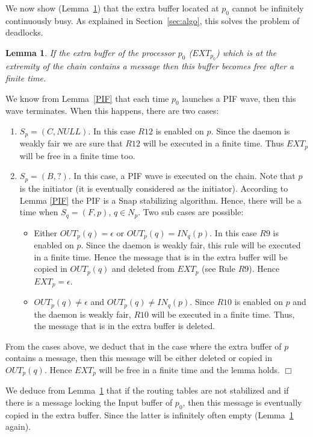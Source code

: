 \documentclass{llncs}
\renewenvironment{proof}{{\it Proof. } }{{\hfill $\Box$}\vspace{.5pc}}
\newtheorem{lem}{Lemma}
\begin{document}
We now show (Lemma~\ref{INTFree}) that the extra buffer located at $p_0$ cannot be infinitely continuously busy.  As explained in
Section~\ref{sec:algo}, this solves the problem of deadlocks. 

\begin{lem}\label{INTFree}
If the extra buffer of the processor $p_0$ ($EXT_{p_0}$) which is at the extremity of the chain contains a message then
this buffer becomes free after a finite time.
\end{lem}  

\begin{proof}
We know from Lemma~\ref{PIF} that each time $p_0$
launches a PIF wave, then this wave terminates.  When this happens, there are two cases:
\begin{enumerate}
\item{$S_{p}=(C,NULL)$}. In this case $R12$ is enabled on $p$. Since the daemon is weakly fair we are sure that $R12$ will be executed in a finite time. Thus $EXT_{p}$ will be free in a finite time too.
\item{$S_{p}=(B,?)$}. In this case, a PIF wave is executed on the chain. Note that $p$ is the initiator (it is eventually considered as the initiator). According to Lemma \ref{PIF} the PIF is a Snap stabilizing algorithm. Hence, there will be a time when $S_{q}=(F,p)$, $q \in N_{p}$. Two sub cases are possible:
\begin{itemize}
\item\label{BINT}{Either $OUT_{p}(q)=\epsilon$ or $OUT_{p}(q)=IN_{q}(p)$}. In this case $R9$ is enabled on $p$. Since the daemon is weakly fair, this rule will be executed in a finite time. Hence the message that is in the extra buffer will be copied in $OUT_{p}(q)$ and deleted from $EXT_{p}$ (see Rule $R9$). Hence $EXT_{p}=\epsilon$.
\item{$OUT_{p}(q)\ne\epsilon$ and $OUT_{p}(q)\ne IN_{q}(p)$}. Since $R10$ is enabled on $p$ and the daemon is weakly fair, $R10$ will be executed in a finite time. Thus, the message that is in the extra buffer is deleted.  
\end{itemize}
 \end{enumerate}
 
From the cases above, we deduct that in the case where the extra buffer of $p$ contains a message, then this message will be either deleted or copied in $OUT_{p}(q)$. Hence $EXT_{p}$  will be free in a finite time and the lemma holds.     
\end{proof}


 We deduce from Lemma~\ref{INTFree} that if the routing tables are not stabilized and if there is a message locking the
Input buffer of $p_0$, then this message is eventually copied in the extra buffer.  Since the latter is infinitely
often empty (Lemma~\ref{INTFree} again). 
\end{document}
